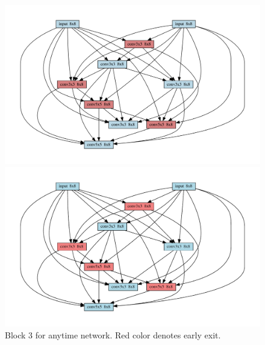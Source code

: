 \begin{figure}[h]
\iflatexml
\includegraphics[width=6\linewidth]{figures/graph_642261663860860599_cell_2.png}
\else
\begin{center}
\includegraphics[width=\linewidth]{figures/graph_642261663860860599_cell_2.pdf}
\end{center}
\fi
\caption{Block 3 for anytime network. Red color denotes early exit.}
\label{fig:best_anytime3}
\end{figure}

%
%


